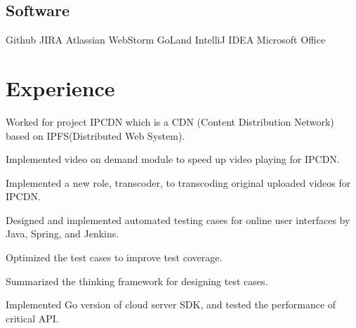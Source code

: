 \documentclass[]{deedy-resume-openfont}
\begin{document}
\begin{minipage}[t]{0.25\textwidth}
\subsection{Software}
Github \textbullet{} JIRA \textbullet{} Atlassian \textbullet{} WebStorm \textbullet{} GoLand \textbullet{} IntelliJ IDEA \textbullet{} Microsoft Office

%
%

\end{minipage} 
\hfill
\begin{minipage}[t]{0.73\textwidth} 


\section{Experience}
\sectionsep
{}
\vspace{\topsep}
\begin{tightemize}
    \item Worked for project IPCDN which is a CDN (Content Distribution Network) based on IPFS(Distributed Web System).
    \item Implemented video on demand module to speed up video playing for IPCDN.
    \item Implemented a new role, transcoder, to transcoding original uploaded videos for IPCDN.
\end{tightemize}
\sectionsep

\begin{tightemize}
\item Designed and implemented automated testing cases for online user interfaces by Java, Spring, and Jenkins.
\item Optimized the test cases to improve test coverage.
\item Summarized the thinking framework for designing test cases.
\end{tightemize}
\sectionsep

\begin{tightemize}
\item Implemented Go version of cloud server SDK, and tested the performance of critical API.
\end{tightemize}
\sectionsep


\end{minipage}
\end{document}
